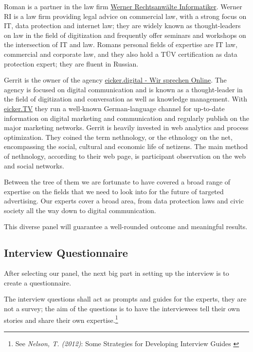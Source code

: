 Roman is a partner in the law firm \href{https://www.werner-ri.de/}{Werner Rechtsanwälte Informatiker}. Werner RI is a law firm providing legal advice on commercial law, with a strong focus on IT, data protection and internet law; they are widely known as thought-leaders on law in the field of digitization and frequently offer seminars and workshops on the intersection of IT and law. Romans personal fields of expertise are IT law, commercial and corporate law, and they also hold a TÜV certification as data protection expert; they are fluent in Russian.

Gerrit is the owner of the agency \href{https://eicker.digital/}{eicker.digital - Wir sprechen Online}. The agency is focused on digital communication and is known as a thought-leader in the field of digitization and conversation as well as knowledge management. With \href{https://www.youtube.com/eickertv}{eicker.TV} they run a well-known German-language channel for up-to-date information on digital marketing and communication and regularly publish on the major marketing networks. Gerrit is heavily invested in web analytics and process optimization. They coined the term nethnology, or the ethnology on the net, encompassing the social, cultural and economic life of netizens. The main method of nethnology, according to their web page, is participant observation on the web and social networks.

Between the tree of them we are fortunate to have covered a broad range of expertise on the fields that we need to look into for the future of targeted advertising. Our experts cover a broad area, from data protection laws and civic society all the way down to digital communication. 

This diverse panel will guarantee a well-rounded outcome and meaningful results.

\subsection{Interview Questionnaire}

After selecting our panel, the next big part in setting up the interview is to create a questionnaire.

The interview questions shall act as prompts and guides for the experts, they are not a survey; the aim of the questions is to have the interviewees tell their own stories and share their own expertise.\footnote{See \textit{Nelson, T. (2012)}: Some Strategies for Developing Interview Guides \cite{qualiStrategies}}


